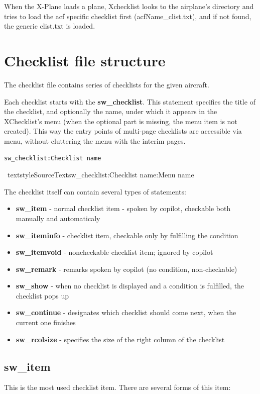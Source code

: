 \documentclass[11pt,parskip=half,a4paper]{scrartcl}
\newcommand\textstyleStrongEmphasis[1]{\textbf{#1}}
\newcommand\textstyleSourceText[1]{\texttt{#1}}
\begin{document}
When the X-Plane loads a plane, Xchecklist looks to the airplane's directory and tries to load the acf specific
checklist first (acfName\_clist.txt), and if not found, the generic clist.txt is loaded.


\section{Checklist file structure}

The checklist file contains series of checklists for the given aircraft.

Each checklist starts with the \textstyleStrongEmphasis{sw\_checklist}. This statement specifies the title of the checklist, and optionally the name, under which it appears in the XChecklist's menu (when the optional part is missing, the menu item is not created). This way the {\textquotedbl}entry points{\textquotedbl} of multi-page checklists are accessible via menu, without cluttering the menu with the interim pages.

\textstyleSourceText{sw\_checklist:Checklist name}

\ textstyleSourceText{sw\_checklist:Checklist name:Menu name}

The checklist itself can contain several types of statements:

\begin{itemize}
\item \textstyleStrongEmphasis{sw\_item} - normal checklist item - spoken by copilot, checkable both manually and automaticaly 
\item \textstyleStrongEmphasis{sw\_iteminfo} - checklist item, checkable only by fulfilling the condition 
\item \textstyleStrongEmphasis{sw\_itemvoid} - noncheckable checklist item; ignored by copilot 
\item \textstyleStrongEmphasis{sw\_remark} - remarks spoken by copilot (no condition, non-checkable) 
\item \textstyleStrongEmphasis{sw\_show} - when no checklist is displayed and a condition is fulfilled, the checklist pops up 
\item \textstyleStrongEmphasis{sw\_continue} - designates which checklist should come next, when the current one
finishes 
\item \textstyleStrongEmphasis{sw\_rcolsize} - specifies the size of the {\textquotedbl}right column{\textquotedbl} of the checklist 
\end{itemize}
\subsection{sw\_item}
This is the most used checklist item. There are several forms of this item:
\end{document}
